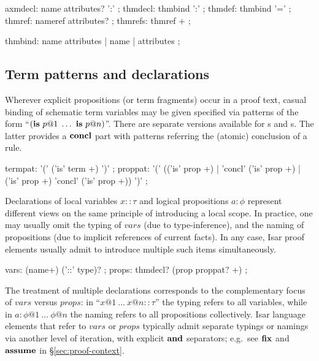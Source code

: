 \begin{rail}
  axmdecl: name attributes? ':'
  ;
  thmdecl: thmbind ':'
  ;
  thmdef: thmbind '='
  ;
  thmref: nameref attributes?
  ;
  thmrefs: thmref +
  ;

  thmbind: name attributes | name | attributes
  ;
\end{rail}


\subsection{Term patterns and declarations}\label{sec:term-decls}

Wherever explicit propositions (or term fragments) occur in a proof text,
casual binding of schematic term variables may be given specified via patterns
of the form ``$({\mathord{\mathbf{is}}}~p@1\;\dots~{\mathord{\mathbf{is}}}~p@n)$''.  There are separate versions
available for s and s.  The latter provides a
${\mathord{\mathbf{concl}}}$ part with patterns referring the (atomic) conclusion of a rule.

\begin{rail}
  termpat: '(' ('is' term +) ')'
  ;
  proppat: '(' (('is' prop +) | 'concl' ('is' prop +) | ('is' prop +) 'concl' ('is' prop +)) ')'
  ;
\end{rail}

Declarations of local variables $x :: \tau$ and logical propositions $a :
\phi$ represent different views on the same principle of introducing a local
scope.  In practice, one may usually omit the typing of $vars$ (due to
type-inference), and the naming of propositions (due to implicit references of
current facts).  In any case, Isar proof elements usually admit to introduce
multiple such items simultaneously.

\begin{rail}
  vars: (name+) ('::' type)?
  ;
  props: thmdecl? (prop proppat? +)
  ;
\end{rail}

The treatment of multiple declarations corresponds to the complementary focus
of $vars$ versus $props$: in ``$x@1~\dots~x@n :: \tau$'' the typing refers to
all variables, while in $a\colon \phi@1~\dots~\phi@n$ the naming refers to all
propositions collectively.  Isar language elements that refer to $vars$ or
$props$ typically admit separate typings or namings via another level of
iteration, with explicit ${\mathord{\mathbf{and}}}$ separators; e.g.\ see ${\mathord{\mathbf{fix}}}$ and
${\mathord{\mathbf{assume}}}$ in \S\ref{sec:proof-context}.


